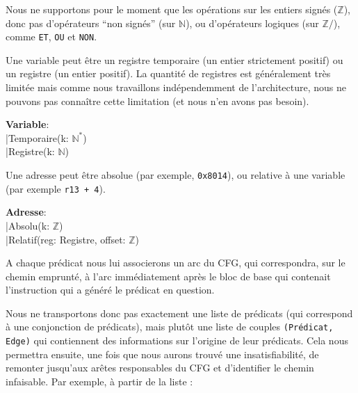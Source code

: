 \documentclass[french]{article}
\begin{document}
  Nous ne supportons pour le moment que les opérations sur les entiers signés ($\mathds{Z}$), donc pas d'opérateurs ``non signés'' (sur $\mathds{N}$), ou d'opérateurs logiques (sur $\mathds{Z}/$), comme \texttt{ET}, \texttt{OU} et \texttt{NON}.
  
  Une variable peut être un registre temporaire (un entier strictement positif) ou un registre (un entier positif). La quantité de registres est généralement très limitée mais comme nous travaillons indépendemment de l'architecture, nous ne pouvons pas connaître cette limitation (et nous n'en avons pas besoin).

  \begin{algorithm}[H]
        \textbf{Variable}:\\
            \qquad |\quad Temporaire(k: $\mathds{N^*}$)\\
            \qquad |\quad Registre(k: $\mathds{N}$)\\
  \end{algorithm}
  
  Une adresse peut être absolue (par exemple, \texttt{0x8014}), ou relative à une variable (par exemple \texttt{r13 + 4}).
  
  \begin{algorithm}[H]
        \textbf{Adresse}:\\
            \qquad |\quad Absolu(k: $\mathds{Z}$)\\
            \qquad |\quad Relatif(reg: Registre, offset: $\mathds{Z}$)\\
  \end{algorithm}

  \bigbreak


  A chaque prédicat nous lui associerons un arc du CFG, qui correspondra, sur le chemin emprunté, à l'arc immédiatement après le bloc de base qui contenait l'instruction qui a généré le prédicat en question.
  
  Nous ne transportons donc pas exactement une liste de prédicats (qui correspond à une conjonction de prédicats), mais plutôt une liste de couples \texttt{(Prédicat, Edge)} qui contiennent des informations sur l'origine de leur prédicats. Cela nous permettra ensuite, une fois que nous aurons trouvé une insatisfiabilité, de remonter jusqu'aux arêtes responsables du CFG et d'identifier le chemin infaisable. Par exemple, à partir de la liste :
  
\end{document}
